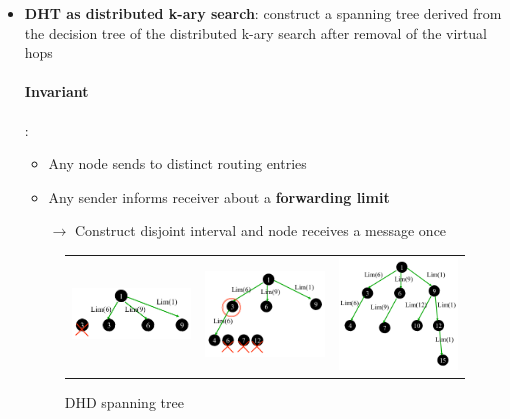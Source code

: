 \begin{itemize}
    \item \textbf{DHT as distributed k-ary search}: construct a spanning tree
        derived from the decision tree of the distributed k-ary search after removal
        of the virtual hops

        \paragraph{Invariant}:
        \begin{itemize}
            \item Any node sends to distinct routing entries
            \item Any sender informs receiver about a \textbf{forwarding limit}
            \item[$\to$] Construct disjoint interval and node receives a message once
        \end{itemize}

        \begin{figure}[!ht]
            \centering
            \begin{tabular}{m{4cm}m{4cm}m{4cm}}
                \includegraphics[width=4cm]{img/DHT1.png}
                & \includegraphics[width=4cm]{img/DHT2.png}
                & \includegraphics[width=4cm]{img/DHT3.png}\\
            \end{tabular}
            \caption{DHD spanning tree}
        \end{figure}
        \FloatBarrier{}


\end{itemize}
